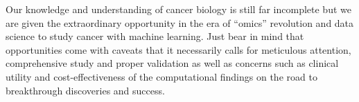 Our knowledge and understanding of cancer biology is still far incomplete but we are given the extraordinary opportunity in the era of ``omics'' revolution and data science to study cancer with machine learning. Just bear in mind that opportunities come with caveats that it necessarily calls for meticulous attention, comprehensive study and proper validation as well as concerns such as clinical utility and cost-effectiveness of the computational findings on the road to breakthrough discoveries and success.
